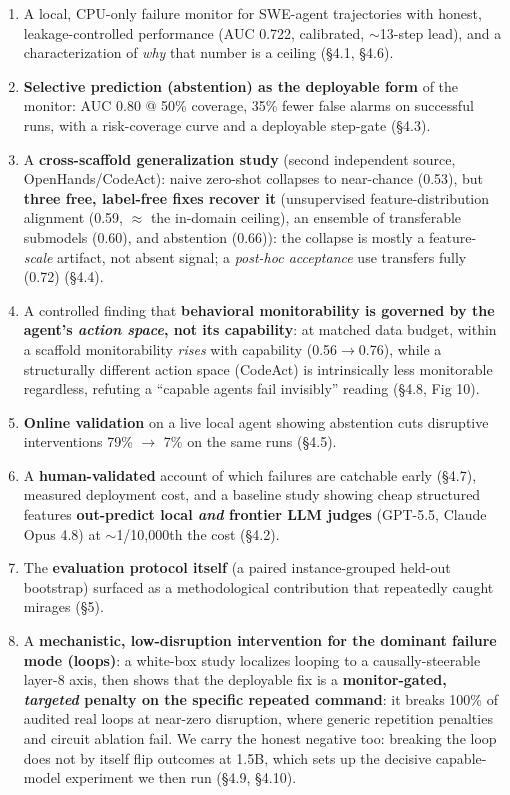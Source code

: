 \begin{enumerate}
\item A local, CPU-only failure monitor for SWE-agent trajectories with honest, leakage-controlled performance (AUC 0.722, calibrated, $\sim$13-step lead), and a characterization of \emph{why} that number is a ceiling (\S4.1, \S4.6).
\item \textbf{Selective prediction (abstention) as the deployable form} of the monitor: AUC 0.80 @ 50\% coverage, 35\% fewer false alarms on successful runs, with a risk-coverage curve and a deployable step-gate (\S4.3).
\item A \textbf{cross-scaffold generalization study} (second independent source, OpenHands/CodeAct): naive zero-shot collapses to near-chance (0.53), but \textbf{three free, label-free fixes recover it} (unsupervised feature-distribution alignment (0.59, $\approx$ the in-domain ceiling), an ensemble of transferable submodels (0.60), and abstention (0.66)): the collapse is mostly a feature-\emph{scale} artifact, not absent signal; a \emph{post-hoc acceptance} use transfers fully (0.72) (\S4.4).
\item A controlled finding that \textbf{behavioral monitorability is governed by the agent's \emph{action space}, not its capability}: at matched data budget, within a scaffold monitorability \emph{rises} with capability (0.56$\to$0.76), while a structurally different action space (CodeAct) is intrinsically less monitorable regardless, refuting a ``capable agents fail invisibly'' reading (\S4.8, Fig 10).
\item \textbf{Online validation} on a live local agent showing abstention cuts disruptive interventions 79\% $\to$ 7\% on the same runs (\S4.5).
\item A \textbf{human-validated} account of which failures are catchable early (\S4.7), measured deployment cost, and a baseline study showing cheap structured features \textbf{out-predict local \emph{and} frontier LLM judges} (GPT-5.5, Claude Opus 4.8) at $\sim$1/10,000th the cost (\S4.2).
\item The \textbf{evaluation protocol itself} (a paired instance-grouped held-out bootstrap) surfaced as a methodological contribution that repeatedly caught mirages (\S5).
\item A \textbf{mechanistic, low-disruption intervention for the dominant failure mode (loops)}: a white-box study localizes looping to a causally-steerable layer-8 axis, then shows that the deployable fix is a \textbf{monitor-gated, \emph{targeted} penalty on the specific repeated command}: it breaks 100\% of audited real loops at near-zero disruption, where generic repetition penalties and circuit ablation fail. We carry the honest negative too: breaking the loop does not by itself flip outcomes at 1.5B, which sets up the decisive capable-model experiment we then run (\S4.9, \S4.10).

\end{enumerate}

